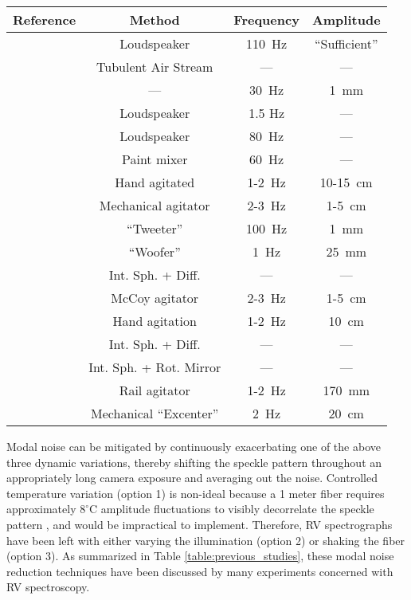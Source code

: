 \documentclass[twocolumn]{emulateapj}
\begin{document}
\begin{table*}
\centering
\caption{Previous study of dynamic modal noise mitigation methods}
	\begin{tabular}{cccc}
		\hline
		Reference & Method & Frequency & Amplitude \\
		\hline\hline
		\citet{Daino1980} & Loudspeaker & \SI{110}{\hertz} & ``Sufficient'' \\
		\hline
		\citet{Hill1980} & Tubulent Air Stream & --- & --- \\
		\hline
		\citet{Baudrand2001} & --- & \SI{30}{\hertz} & \SI{1}{\milli\meter} \\
		\hline
		\multirow{2}{*}{\citet{Lemke2011}} & Loudspeaker & 1.5 Hz & --- \\
		 & Loudspeaker & \SI{80}{\hertz} & --- \\
		\hline
		\multirow{3}{*}{\citet{McCoy2012}} & Paint mixer & \SI{60}{\hertz} & --- \\
		 & Hand agitated & 1-\SI{2}{\hertz} & 10-\SI{15}{\centi\meter} \\
		 & Mechanical agitator & 2-\SI{3}{\hertz} & 1-\SI{5}{\centi\meter} \\
		\hline
		\multirow{2}{*}{\citet{Plavchan2013}} & ``Tweeter'' & \SI{100}{\hertz} & \SI{1}{\milli\meter} \\
		 & ``Woofer'' & \SI{1}{\hertz} & \SI{25}{\milli\meter} \\
		\hline
		\multirow{3}{*}{\citet{Mahadevan2014}} & Int. Sph. + Diff. & --- & ---\\
		 & McCoy agitator & 2-\SI{3}{\hertz} & 1-\SI{5}{\centi\meter} \\
		 & Hand agitation & 1-\SI{2}{\hertz} & \SI{10}{\centi\meter} \\
		\hline
		\multirow{2}{*}{\citet{Halverson2014}} & Int. Sph. + Diff. & --- & --- \\
		 & Int. Sph. + Rot. Mirror & --- & --- \\
		\hline		
		\citet{Roy2014} & Rail agitator & 1-\SI{2}{\hertz} & \SI{170}{\milli\meter} \\
		\hline
		\citet{Sablowski2015} & Mechanical ``Excenter''& \SI{2}{\hertz} & \SI{20}{\centi\meter} \\
		\hline
	\end{tabular}
\label{table:previous_studies}
\end{table*}

Modal noise can be mitigated by continuously exacerbating one of the above three dynamic variations, thereby shifting the speckle pattern throughout an appropriately long camera exposure and averaging out the noise. Controlled temperature variation (option 1) is non-ideal because a 1 meter fiber requires approximately $8 ^\circ \mathrm{C}$ amplitude fluctuations to visibly decorrelate the speckle pattern \citep{Redding2013}, and would be impractical to implement. Therefore, RV spectrographs have been left with either varying the illumination (option 2) or shaking the fiber (option 3). As summarized in Table \ref{table:previous_studies}, these modal noise reduction techniques have been discussed by many experiments concerned with RV spectroscopy.
\end{document}
